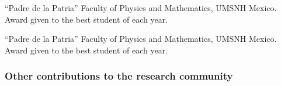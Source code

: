 {``Padre de la Patria''}
{
{Faculty of Physics and Mathematics, UMSNH}%
}
{
{Mexico.}%
}
{}
{
{Award given to the best student of each year.}%
}

{``Padre de la Patria''}
{
{Faculty of Physics and Mathematics, UMSNH}%
}
{
{Mexico.}%
}
{}
{
{Award given to the best student of each year.}%
}









\subsubsection*{Other contributions to the research community} 

